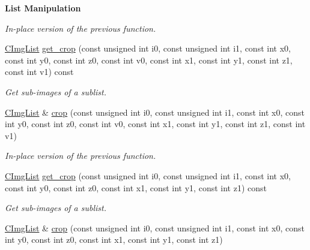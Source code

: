 \begin{Indent}{\bf List Manipulation}
\begin{DoxyCompactItemize}
\begin{DoxyCompactList}\small\item\em In-\/place version of the previous function. \end{DoxyCompactList}\item 
\hypertarget{structcimg__library_1_1_c_img_list_a4f70420a93bcca2ff80acd1f30e2eba1}{\hyperlink{structcimg__library_1_1_c_img_list}{C\-Img\-List} \hyperlink{structcimg__library_1_1_c_img_list_a4f70420a93bcca2ff80acd1f30e2eba1}{get\-\_\-crop} (const unsigned int i0, const unsigned int i1, const int x0, const int y0, const int z0, const int v0, const int x1, const int y1, const int z1, const int v1) const }\label{structcimg__library_1_1_c_img_list_a4f70420a93bcca2ff80acd1f30e2eba1}

\begin{DoxyCompactList}\small\item\em Get sub-\/images of a sublist. \end{DoxyCompactList}\item 
\hypertarget{structcimg__library_1_1_c_img_list_ac9d16bb08470bbecf69a4f3eb4f69649}{\hyperlink{structcimg__library_1_1_c_img_list}{C\-Img\-List} \& \hyperlink{structcimg__library_1_1_c_img_list_ac9d16bb08470bbecf69a4f3eb4f69649}{crop} (const unsigned int i0, const unsigned int i1, const int x0, const int y0, const int z0, const int v0, const int x1, const int y1, const int z1, const int v1)}\label{structcimg__library_1_1_c_img_list_ac9d16bb08470bbecf69a4f3eb4f69649}

\begin{DoxyCompactList}\small\item\em In-\/place version of the previous function. \end{DoxyCompactList}\item 
\hypertarget{structcimg__library_1_1_c_img_list_a91453fc7caa06928b8223e688706addd}{\hyperlink{structcimg__library_1_1_c_img_list}{C\-Img\-List} \hyperlink{structcimg__library_1_1_c_img_list_a91453fc7caa06928b8223e688706addd}{get\-\_\-crop} (const unsigned int i0, const unsigned int i1, const int x0, const int y0, const int z0, const int x1, const int y1, const int z1) const }\label{structcimg__library_1_1_c_img_list_a91453fc7caa06928b8223e688706addd}

\begin{DoxyCompactList}\small\item\em Get sub-\/images of a sublist. \end{DoxyCompactList}\item 
\hypertarget{structcimg__library_1_1_c_img_list_a4f13883ebc7c9f627835470de64492e8}{\hyperlink{structcimg__library_1_1_c_img_list}{C\-Img\-List} \& \hyperlink{structcimg__library_1_1_c_img_list_a4f13883ebc7c9f627835470de64492e8}{crop} (const unsigned int i0, const unsigned int i1, const int x0, const int y0, const int z0, const int x1, const int y1, const int z1)}\label{structcimg__library_1_1_c_img_list_a4f13883ebc7c9f627835470de64492e8}


\end{DoxyCompactItemize}
\end{Indent}
